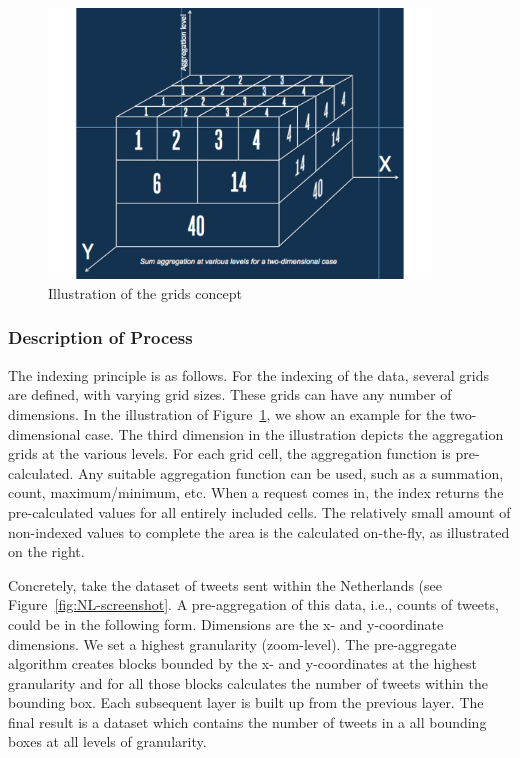 \begin{figure}[t]
\centering
\includegraphics[width=4in]{Figures/grids.pdf}
\caption{Illustration of the grids concept}
\label{fig:grids}
\end{figure}


\subsubsection{Description of Process}

The indexing principle is as follows.  For the indexing of the data,
several grids are defined, with varying grid sizes. These grids can have
any number of dimensions. In the illustration of Figure~\ref{fig:grids}, we
show an example for the two-dimensional case. The third dimension in the
illustration depicts the aggregation grids at the various levels. For each
grid cell, the aggregation function is pre-calculated. Any suitable
aggregation function can be used, such as a summation, count,
maximum/minimum, etc. When a request comes in, the index returns the
pre-calculated values for all entirely included cells. The relatively small
amount of non-indexed values to complete the area is the calculated
on-the-fly, as illustrated on the right.

Concretely, take the dataset of tweets sent within the Netherlands (see
Figure~\ref{fig:NL-screenshot}. A pre-aggregation of this data, i.e.,
counts of tweets, could be in the following form. Dimensions are the x- and
y-coordinate dimensions. We set a highest granularity (zoom-level). The
pre-aggregate algorithm creates blocks bounded by the x- and y-coordinates
at the highest granularity and for all those blocks calculates the number
of tweets within the bounding box. Each subsequent layer is built up from
the previous layer. The final result is a dataset which contains the number
of tweets in a all bounding boxes at all levels of granularity.

